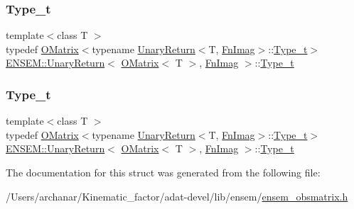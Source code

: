 \subsubsection{\texorpdfstring{Type\_t}{Type\_t}\hspace{0.1cm}{\footnotesize\ttfamily [2/3]}}
{\footnotesize\ttfamily template$<$class T $>$ \\
typedef \mbox{\hyperlink{classENSEM_1_1OMatrix}{O\+Matrix}}$<$typename \mbox{\hyperlink{structENSEM_1_1UnaryReturn}{Unary\+Return}}$<$T, \mbox{\hyperlink{structENSEM_1_1FnImag}{Fn\+Imag}}$>$\+::\mbox{\hyperlink{structENSEM_1_1UnaryReturn_3_01OMatrix_3_01T_01_4_00_01FnImag_01_4_a0841f7311ee5495c55d754fd855f045c}{Type\+\_\+t}}$>$ \mbox{\hyperlink{structENSEM_1_1UnaryReturn}{E\+N\+S\+E\+M\+::\+Unary\+Return}}$<$ \mbox{\hyperlink{classENSEM_1_1OMatrix}{O\+Matrix}}$<$ T $>$, \mbox{\hyperlink{structENSEM_1_1FnImag}{Fn\+Imag}} $>$\+::\mbox{\hyperlink{structENSEM_1_1UnaryReturn_3_01OMatrix_3_01T_01_4_00_01FnImag_01_4_a0841f7311ee5495c55d754fd855f045c}{Type\+\_\+t}}}

\mbox{\label{structENSEM_1_1UnaryReturn_3_01OMatrix_3_01T_01_4_00_01FnImag_01_4_a0841f7311ee5495c55d754fd855f045c}} 
\subsubsection{\texorpdfstring{Type\_t}{Type\_t}\hspace{0.1cm}{\footnotesize\ttfamily [3/3]}}
{\footnotesize\ttfamily template$<$class T $>$ \\
typedef \mbox{\hyperlink{classENSEM_1_1OMatrix}{O\+Matrix}}$<$typename \mbox{\hyperlink{structENSEM_1_1UnaryReturn}{Unary\+Return}}$<$T, \mbox{\hyperlink{structENSEM_1_1FnImag}{Fn\+Imag}}$>$\+::\mbox{\hyperlink{structENSEM_1_1UnaryReturn_3_01OMatrix_3_01T_01_4_00_01FnImag_01_4_a0841f7311ee5495c55d754fd855f045c}{Type\+\_\+t}}$>$ \mbox{\hyperlink{structENSEM_1_1UnaryReturn}{E\+N\+S\+E\+M\+::\+Unary\+Return}}$<$ \mbox{\hyperlink{classENSEM_1_1OMatrix}{O\+Matrix}}$<$ T $>$, \mbox{\hyperlink{structENSEM_1_1FnImag}{Fn\+Imag}} $>$\+::\mbox{\hyperlink{structENSEM_1_1UnaryReturn_3_01OMatrix_3_01T_01_4_00_01FnImag_01_4_a0841f7311ee5495c55d754fd855f045c}{Type\+\_\+t}}}



The documentation for this struct was generated from the following file\+:\begin{DoxyCompactItemize}
\item 
/\+Users/archanar/\+Kinematic\+\_\+factor/adat-\/devel/lib/ensem/\mbox{\hyperlink{adat-devel_2lib_2ensem_2ensem__obsmatrix_8h}{ensem\+\_\+obsmatrix.\+h}}\end{DoxyCompactItemize}
